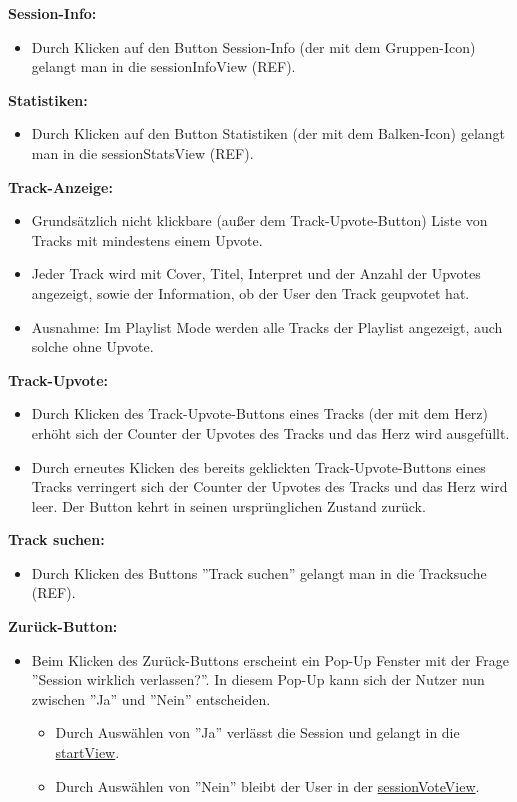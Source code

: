 \documentclass[oneside, ngerman]{sdqtechreport}
\begin{document}
\textbf{Session-Info:}
\begin{itemize}
    \item Durch Klicken auf den Button Session-Info (der mit dem Gruppen-Icon) gelangt man in die sessionInfoView (REF).
\end{itemize}

\textbf{Statistiken:}
\begin{itemize}
    \item Durch Klicken auf den Button Statistiken (der mit dem Balken-Icon) gelangt man in die sessionStatsView (REF).
\end{itemize}

\textbf{Track-Anzeige:}
\begin{itemize}
    \item Grundsätzlich nicht klickbare (außer dem Track-Upvote-Button) Liste von Tracks mit mindestens einem Upvote. \item Jeder Track wird mit Cover, Titel, Interpret und der Anzahl der Upvotes angezeigt, sowie der Information, ob der User den Track geupvotet hat.
    \item Ausnahme: Im Playlist Mode werden alle Tracks der Playlist angezeigt, auch solche ohne Upvote.
\end{itemize}

\textbf{Track-Upvote:}
\begin{itemize}
    \item Durch Klicken des Track-Upvote-Buttons eines Tracks (der mit dem Herz) erhöht sich der Counter der Upvotes des Tracks und das Herz wird ausgefüllt.
    \item Durch erneutes Klicken des bereits geklickten Track-Upvote-Buttons eines Tracks verringert sich der Counter der Upvotes des Tracks und das Herz wird leer. Der Button kehrt in seinen ursprünglichen Zustand zurück.
\end{itemize}

\textbf{Track suchen:}
\begin{itemize}
    \item Durch Klicken des Buttons ''Track suchen'' gelangt man in die Tracksuche (REF).
\end{itemize}

\textbf{Zurück-Button:}
\begin{itemize}
    \item Beim Klicken des Zurück-Buttons erscheint ein Pop-Up Fenster mit der Frage ''Session wirklich verlassen?''. In diesem Pop-Up kann sich der Nutzer nun zwischen ''Ja'' und ''Nein'' entscheiden.
    \begin{itemize}
        \item Durch Auswählen von ''Ja'' verlässt die Session und gelangt in die \hyperlink{startView}{startView}.
        \item Durch Auswählen von ''Nein'' bleibt der User in der \hyperlink{sessionVoteView}{sessionVoteView}.
    \end{itemize}
\end{itemize}
\end{document}
